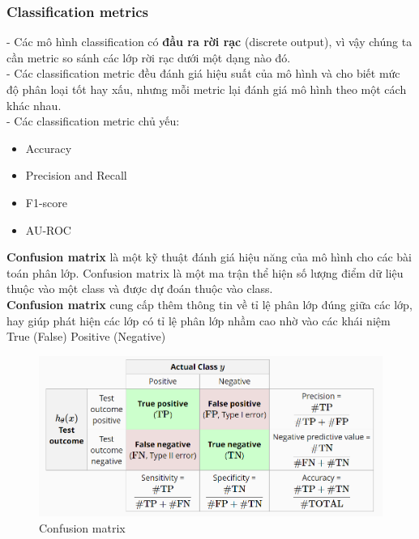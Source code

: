 \subsubsection{Classification metrics}
- Các mô hình classification có \textbf{đầu ra rời rạc} (discrete output), vì vậy chúng ta cần metric so sánh các lớp rời rạc dưới một dạng nào đó.\\
- Các classification metric đều đánh giá hiệu suất của mô hình và cho biết mức độ phân loại tốt hay xấu, nhưng mỗi metric lại đánh giá mô hình theo một cách khác nhau.\\
- Các classification metric chủ yếu:
\begin{itemize}
    \item Accuracy
    \item Precision and Recall
    \item F1-score
    \item AU-ROC
\end{itemize}

\textbf{Confusion matrix} \cite{mlwiki} \cite{aiuit} là một kỹ thuật đánh giá hiệu năng của mô hình cho các bài toán phân lớp. Confusion matrix là một ma trận thể hiện số lượng điểm dữ liệu thuộc vào một class và được dự đoán thuộc vào class.\\
\textbf{Confusion matrix} cung cấp thêm thông tin về tỉ lệ phân lớp đúng giữa các lớp, hay giúp phát hiện các lớp có tỉ lệ phân lớp nhầm cao nhờ vào các khái niệm True (False) Positive (Negative)\\

\begin{figure}[H]
    \centering
    \includegraphics[width=1\linewidth]{img/binary_classifiers.png}
    \caption{Confusion matrix}
\end{figure}

